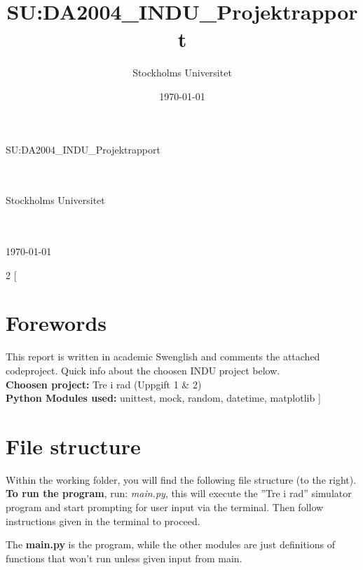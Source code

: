 \documentclass[12pt,a4paper]{article}
\title{SU:DA2004\_INDU\_Projektrapport}
\author{Stockholms Universitet}
\date{\today}
\begin{document}
\thispagestyle{empty}
\begin{Huge}
SU:DA2004\_INDU\_Projektrapport
\end{Huge}
\begin{huge}
\\\\Stockholms Universitet
\end{huge}
\begin{LARGE}
\\\\\today
\end{LARGE}

\begin{multicols}{2}
[
\section*{Forewords}
This report is written in academic Swenglish and comments the attached codeproject. Quick info about the choosen INDU project below.
\\\textbf{Choosen project:} Tre i rad (Uppgift 1 \& 2)
\\\textbf{Python Modules used:} unittest, mock, random, datetime, matplotlib
\tableofcontents
]
\section{File structure}
Within the working folder, you will find the following file structure (to the right). \textbf{To run the program}, run: \emph{main.py}, this will execute the ''Tre i rad'' simulator program and start prompting for user input via the terminal. Then follow instructions given in the terminal to proceed.

The \textbf{main.py} is the program, while the other modules are just definitions of functions that won't run unless given input from main.
\end{multicols}
\end{document}
